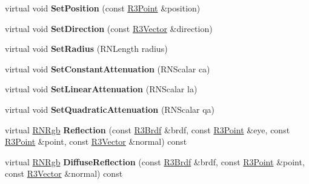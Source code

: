 \begin{DoxyCompactItemize}
\item 
virtual void {\bfseries Set\+Position} (const \hyperlink{class_r3_point}{R3\+Point} \&position)\hypertarget{class_r3_area_light_a0e775ccfabb5ea341178e52ee1a7ef22}{}\label{class_r3_area_light_a0e775ccfabb5ea341178e52ee1a7ef22}

\item 
virtual void {\bfseries Set\+Direction} (const \hyperlink{class_r3_vector}{R3\+Vector} \&direction)\hypertarget{class_r3_area_light_ad2cee2e31fb6540d305703c4cd5b4a8e}{}\label{class_r3_area_light_ad2cee2e31fb6540d305703c4cd5b4a8e}

\item 
virtual void {\bfseries Set\+Radius} (R\+N\+Length radius)\hypertarget{class_r3_area_light_a8583ca7b46e03d2a2aea02f68b32792d}{}\label{class_r3_area_light_a8583ca7b46e03d2a2aea02f68b32792d}

\item 
virtual void {\bfseries Set\+Constant\+Attenuation} (R\+N\+Scalar ca)\hypertarget{class_r3_area_light_ad3b981a935238c12978394b3aef9feaa}{}\label{class_r3_area_light_ad3b981a935238c12978394b3aef9feaa}

\item 
virtual void {\bfseries Set\+Linear\+Attenuation} (R\+N\+Scalar la)\hypertarget{class_r3_area_light_a0e2b9c9e544af15c84484cd4297d5332}{}\label{class_r3_area_light_a0e2b9c9e544af15c84484cd4297d5332}

\item 
virtual void {\bfseries Set\+Quadratic\+Attenuation} (R\+N\+Scalar qa)\hypertarget{class_r3_area_light_a7268288d6ec3bb0d8db71205f8056614}{}\label{class_r3_area_light_a7268288d6ec3bb0d8db71205f8056614}

\item 
virtual \hyperlink{class_r_n_rgb}{R\+N\+Rgb} {\bfseries Reflection} (const \hyperlink{class_r3_brdf}{R3\+Brdf} \&brdf, const \hyperlink{class_r3_point}{R3\+Point} \&eye, const \hyperlink{class_r3_point}{R3\+Point} \&point, const \hyperlink{class_r3_vector}{R3\+Vector} \&normal) const \hypertarget{class_r3_area_light_a74eceeff72e14df474b8dc1728b09c44}{}\label{class_r3_area_light_a74eceeff72e14df474b8dc1728b09c44}

\item 
virtual \hyperlink{class_r_n_rgb}{R\+N\+Rgb} {\bfseries Diffuse\+Reflection} (const \hyperlink{class_r3_brdf}{R3\+Brdf} \&brdf, const \hyperlink{class_r3_point}{R3\+Point} \&point, const \hyperlink{class_r3_vector}{R3\+Vector} \&normal) const \hypertarget{class_r3_area_light_ab4fe8cd7d89692bd7d03f2b0e910aaa5}{}\label{class_r3_area_light_ab4fe8cd7d89692bd7d03f2b0e910aaa5}


\end{DoxyCompactItemize}
